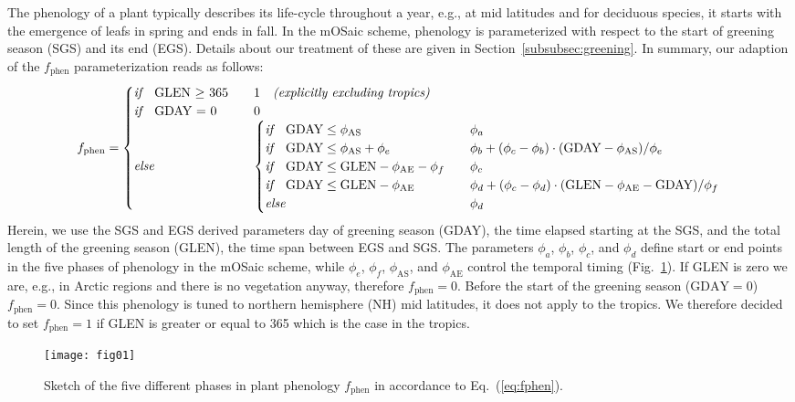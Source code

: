 \documentclass[gmd, manuscript]{copernicus}
\begin{document}
The phenology of a plant typically describes its life-cycle throughout a year, e.g., at mid latitudes and for deciduous species, it starts with the emergence of leafs in spring and ends in fall. In the mOSaic scheme, phenology is parameterized with respect to the start of greening season (SGS) and its end (EGS). Details about our treatment of these are given in Section~\ref{subsubsec:greening}. In summary, our adaption of the $f_\text{phen}$ parameterization reads as follows:
%
\begin{equation}
  f_\text{phen} =
  \begin{cases}
    \emph{if} \quad \text{GLEN $\ge$ 365} & \quad 1 \quad \emph{(explicitly excluding tropics)} \\
    \emph{if} \quad \text{GDAY = 0}  & \quad 0 \\
    \emph{else}  & \quad 
    \begin{cases}
      \emph{if} \quad \text{GDAY} \le \phi_\text{AS}  & \quad \phi_a \\
      \emph{if} \quad \text{GDAY} \le \phi_\text{AS} + \phi_e  & \quad \phi_b+(\phi_c-\phi_b)\cdot(\text{GDAY}-\phi_\text{AS})/\phi_e\\
      \emph{if} \quad \text{GDAY} \le \text{GLEN} - \phi_\text{AE} - \phi_f  & \quad \phi_c\\
      \emph{if} \quad \text{GDAY} \le \text{GLEN} - \phi_\text{AE}  & \quad \phi_d+(\phi_c-\phi_d)\cdot(\text{GLEN}-\phi_\text{AE}-\text{GDAY})/\phi_f\\
      \emph{else} & \quad \phi_d
    \end{cases}
  \end{cases}
  \label{eq:fphen}
\end{equation}
%
Herein, we use the SGS and EGS derived parameters day of greening season (GDAY), the time elapsed starting at the SGS, and the total length of the greening season (GLEN), the time span between EGS and SGS. The parameters $\phi_a$, $\phi_b$, $\phi_c$, and $\phi_d$ define start or end points in the five phases of phenology in the mOSaic scheme, while $\phi_e$, $\phi_f$, $\phi_\text{AS}$, and $\phi_\text{AE}$ control the temporal timing (Fig.~\ref{fig:phenology}). If GLEN is zero we are, e.g., in Arctic regions and there is no vegetation anyway, therefore $f_\text{phen}=0$. Before the start of the greening season ($\text{GDAY}=0$) $f_\text{phen}=0$. Since this phenology is tuned to northern hemisphere (NH) mid latitudes, it does not apply to the tropics. We therefore decided to set $f_\text{phen}=1$ if GLEN is greater or equal to 365 which is the case in the tropics.
%
\begin{figure}[t]
  \texttt{[image: fig01]}
  \caption{Sketch of the five different phases in plant phenology $f_\text{phen}$ in accordance to Eq.~(\ref{eq:fphen}).}
  \label{fig:phenology}
\end{figure}
\end{document}
